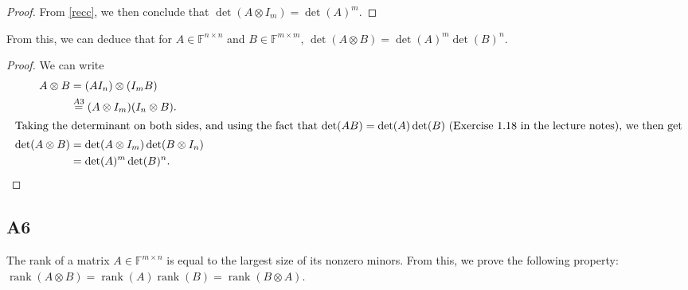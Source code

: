 \documentclass[11pt]{article}
\DeclareMathOperator{\rank}{rank}
\newcommand{\field}{\mathbb{F}} %
\newcommand{\kp}{\otimes} %
\begin{document}
\begin{proof}
From \eqref{recc}, we then conclude that \(\det(A \kp I_m) = \det(A)^m\).
\end{proof}

From this, we can deduce that for \(A \in \field^{n \times n}\) and \(B \in \field^{m \times m}\), \(\det(A \kp B) = \det(A)^m \det(B)^n\).
\begin{proof}
	We can write
	\begin{align*}
	A \kp B &= (A I_n) \kp (I_m B)\\
	&\overset{A3}{=} (A \kp I_m) (I_n \kp B).\\
	\intertext{Taking the determinant on both sides, and using the fact that 
		\(\det(AB) = \det(A)\det(B)\) (Exercise~1.18 in the lecture notes), we then get}
	\det(A \kp B) &= \det(A \kp I_m) \det(B \kp I_n)\\
	&= \det(A)^m \det(B)^n.\qedhere
	\end{align*}
\end{proof}

\subsection*{A6}
The rank of a matrix \(A \in \field^{m \times n}\) is equal to the largest size of its nonzero minors.
From this, we prove the following property: $\rank(A\kp B)=\rank(A)\rank(B)=\rank(B\kp A)$.
\end{document}

